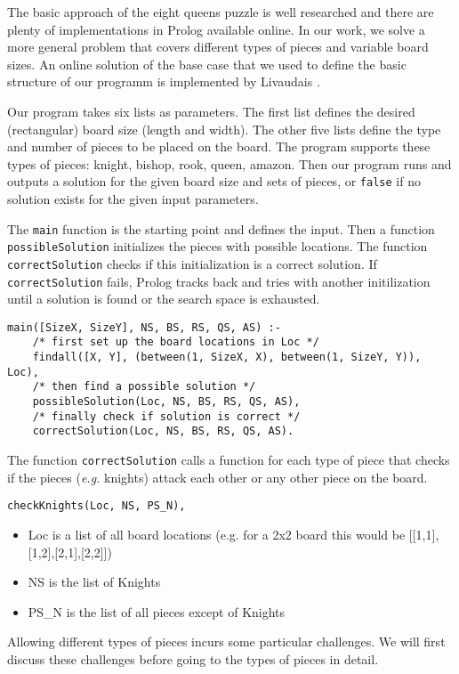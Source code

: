 \documentclass{article}
\begin{document}
The basic approach of the eight queens puzzle is well researched and there are plenty of implementations in Prolog available online. In our work, we solve a more general problem that covers different types of pieces and variable board sizes. An online solution of the base case that we used to define the basic structure of our programm is implemented by Livaudais \cite{8_queens}.

Our program takes six lists as parameters. The first list defines the desired (rectangular) board size (length and width). The other five lists define the type and number of pieces to be placed on the board. The program supports these types of pieces: knight, bishop, rook, queen, amazon. Then our program runs and outputs a solution for the given board size and sets of pieces, or \verb|false| if no solution exists for the given input parameters.

The \verb|main| function is the starting point and defines the input. Then a function \verb|possibleSolution| initializes the pieces with possible locations. The function \verb|correctSolution| checks if this initialization is a correct solution. If \verb|correctSolution| fails, Prolog tracks back and tries with another initilization until a solution is found or the search space is exhausted.
\begin{verbatim}
main([SizeX, SizeY], NS, BS, RS, QS, AS) :-
	/* first set up the board locations in Loc */
	findall([X, Y], (between(1, SizeX, X), between(1, SizeY, Y)), Loc),
	/* then find a possible solution */
	possibleSolution(Loc, NS, BS, RS, QS, AS),
	/* finally check if solution is correct */
	correctSolution(Loc, NS, BS, RS, QS, AS).
\end{verbatim}

The function \verb|correctSolution| calls a function for each type of piece that checks if the pieces (\emph{e.g.} knights) attack each other or any other piece on the board.
\begin{verbatim}
checkKnights(Loc, NS, PS_N),
\end{verbatim}
\begin{itemize}
    \item Loc is a list of all board locations (e.g. for a 2x2 board this would be [[1,1],[1,2],[2,1],[2,2]])
    \item NS is the list of Knights
    \item PS\_N is the list of all pieces except of Knights
\end{itemize}

Allowing different types of pieces incurs some particular challenges. We will first discuss these challenges before going to the types of pieces in detail.
\end{document}
